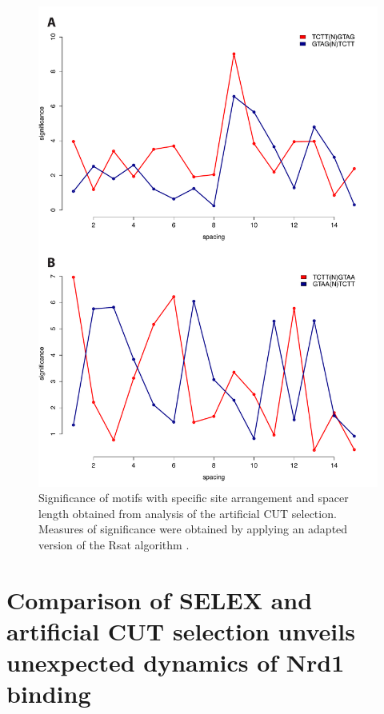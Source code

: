 \begin{figure}[hp!]

\centering
\includegraphics[width=\textwidth]{figures/results/positionalVivo}
\caption[Enrichment of Nrd1 and Nab3 sites with different arrangements and spacings in the artificial CUT selection]{Significance of motifs with specific site arrangement and spacer length obtained from analysis of the artificial CUT selection. Measures of significance were obtained by applying an adapted version of the Rsat algorithm \cite[see methods]{vanhelden:1998:extracting}.}
\label{fig:positionalVivo}

\end{figure} 

\singlespacing
\section{Comparison of SELEX and \invivo{} artificial CUT selection unveils unexpected dynamics of Nrd1 binding}
\doublespacing


